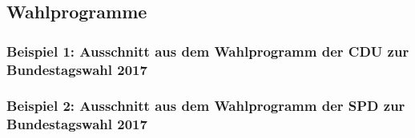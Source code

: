 \pagebreak

\subsection*{Wahlprogramme} \label{subsec:overviewWP}

\subsubsection*{Beispiel 1: Ausschnitt aus dem Wahlprogramm der CDU zur Bundestagswahl 2017}


\subsubsection*{Beispiel 2: Ausschnitt aus dem Wahlprogramm der SPD zur Bundestagswahl 2017}


\pagebreak

